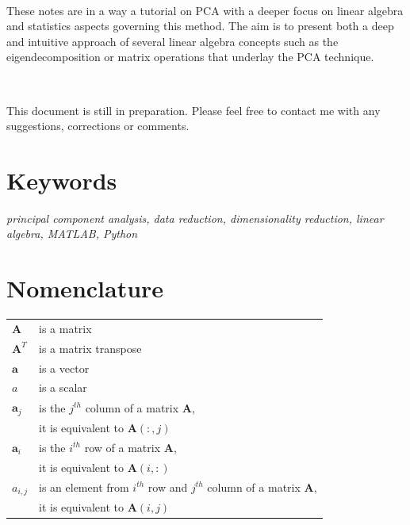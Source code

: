 \documentclass[10pt,twocolumn]{article}
\begin{document}
\,\,

These notes are in a way a tutorial on PCA with a deeper focus on linear algebra and statistics aspects governing this method. The aim is to present both a deep and intuitive approach of several linear algebra concepts such as the eigendecomposition or matrix operations that underlay the PCA technique. 

\,\,

This document is still in preparation. Please feel free to contact me with any suggestions, corrections or comments.

\section*{Keywords}

\textit{principal component analysis, data reduction, dimensionality reduction, linear algebra, MATLAB\textregistered, Python}

\tableofcontents

\section{Nomenclature}

\begin{tabular}{ll}
    $\bm{A}$ & is a matrix \\
     $\bm{A}^T$ & is a matrix transpose \\
     $\bm{a}$ & is a vector \\
     $a$ & is a scalar \\
    $\bm{a}_j$ & is the $j^{th}$ column of a matrix $\bm{A}$, \\
    & it is equivalent to  $\bm{A}(:,j)$ \\
    $\bm{a}_i$ & is the $i^{th}$ row of a matrix $\bm{A}$, \\
    & it is equivalent to  $\bm{A}(i,:)$ \\
    $a_{i,j}$ & is an element from $i^{th}$ row and $j^{th}$ column of a matrix $\bm{A}$, \\ 
    & it is equivalent to  $\bm{A}(i,j)$ \\
\end{tabular}
\end{document}
